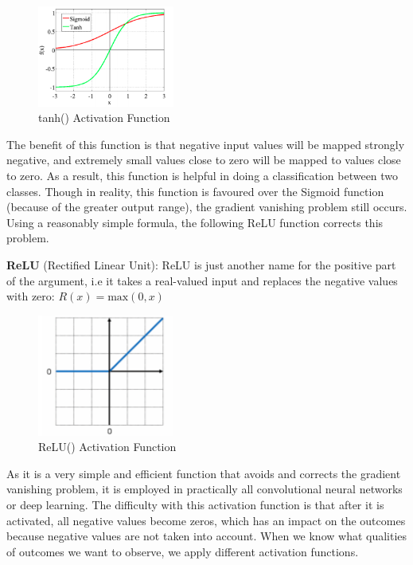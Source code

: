 \documentclass[a4paper,11pt,oneside]{book}
\begin{document}
\begin{figure}[!h]
	\centering
	\includegraphics[width=0.4\textwidth]{figures/tanh}
	\caption{tanh() Activation Function}
	\label{fourthfig}
\end{figure}

The benefit of this function is that negative input values will be mapped strongly negative, and extremely small values close to zero will be mapped to values close to zero. As a result, this function is helpful in doing a classification between two classes.
Though in reality, this function is favoured over the Sigmoid function (because of the greater output range), the gradient vanishing problem still occurs. Using a reasonably simple formula, the following ReLU function corrects this problem.\newline\newline

\textbf{ReLU} (Rectified Linear Unit): ReLU is just another name for the positive part of the argument, i.e it takes a real-valued input and replaces the negative values with zero:
\newline\newline
$R(x)= \text{max}(0,x)$
\begin{figure}[!h]
	\centering
	\includegraphics[width=0.4\textwidth]{figures/Relu}
	\caption{ReLU() Activation Function}
	\label{fifthfig}
\end{figure}
\newline\newline As it is a very simple and efficient function that avoids and corrects the gradient vanishing problem, it is employed in practically all convolutional neural networks or deep learning.
The difficulty with this activation function is that after it is activated, all negative values become zeros, which has an impact on the outcomes because negative values are not taken into account.
\newline\newline When we know what qualities of outcomes we want to observe, we apply different activation functions.
\end{document}

